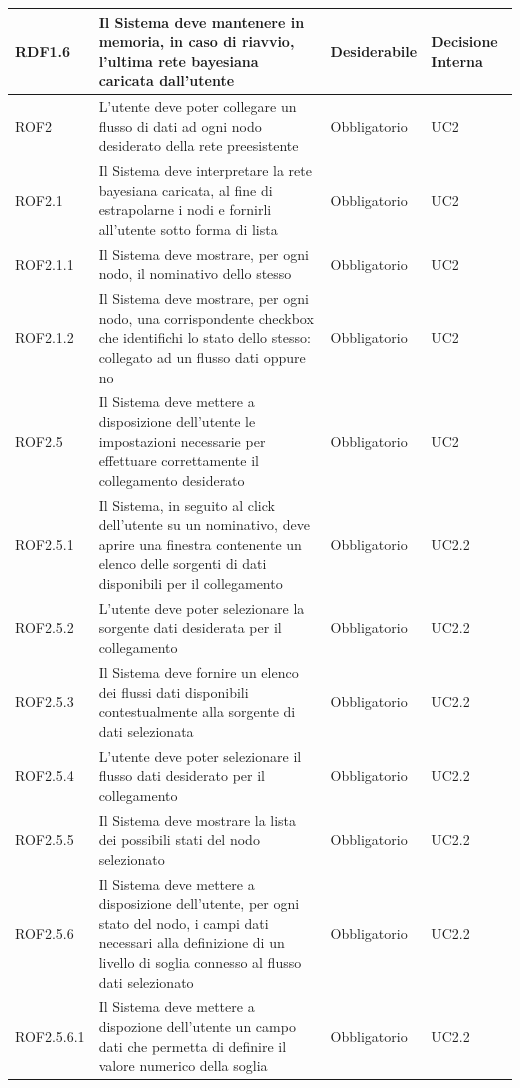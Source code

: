 \begin{center}
\begin{longtable}[c]{|m{}|m{}|m{}|m{}|}
\hline
RDF1.6 & Il Sistema deve mantenere in memoria, in caso di riavvio, l'ultima rete bayesiana caricata dall'utente & Desiderabile & Decisione Interna\\
\hline
\rowcolor{grigio}ROF2 & L'utente deve poter collegare un flusso di dati ad ogni nodo desiderato della rete preesistente & Obbligatorio & UC2\\
\hline
ROF2.1 & Il Sistema deve interpretare la rete bayesiana caricata, al fine di estrapolarne i nodi e fornirli all'utente sotto forma di lista & Obbligatorio & UC2\\
\hline
\rowcolor{grigio}ROF2.1.1 & Il Sistema deve mostrare, per ogni nodo, il nominativo dello stesso & Obbligatorio & UC2\\
\hline
ROF2.1.2 & Il Sistema deve mostrare, per ogni nodo, una corrispondente checkbox che identifichi lo stato dello stesso: collegato ad un flusso dati oppure no & Obbligatorio & UC2\\
\hline
\rowcolor{grigio}ROF2.5 & Il Sistema deve mettere a disposizione dell'utente le impostazioni necessarie per effettuare correttamente il collegamento desiderato & Obbligatorio & UC2\\
\hline
ROF2.5.1 & Il Sistema, in seguito al click dell'utente su un nominativo, deve aprire una finestra contenente un elenco delle sorgenti di dati disponibili per il collegamento & Obbligatorio & UC2.2\\
\hline
\rowcolor{grigio}ROF2.5.2 & L'utente deve poter selezionare la sorgente dati desiderata per il collegamento & Obbligatorio & UC2.2\\
\hline
ROF2.5.3 & Il Sistema deve fornire un elenco dei flussi dati disponibili contestualmente alla sorgente di dati selezionata & Obbligatorio & UC2.2\\
\hline
\rowcolor{grigio}ROF2.5.4 & L'utente deve poter selezionare il flusso dati desiderato per il collegamento & Obbligatorio & UC2.2\\
\hline
ROF2.5.5 & Il Sistema deve mostrare la lista dei possibili stati del nodo selezionato & Obbligatorio & UC2.2\\
\hline
\rowcolor{grigio}ROF2.5.6 & Il Sistema deve mettere a disposizione dell'utente, per ogni stato del nodo, i campi dati necessari alla definizione di un livello di soglia connesso al flusso dati selezionato & Obbligatorio & UC2.2\\
\hline
ROF2.5.6.1 & Il Sistema deve mettere a dispozione dell'utente un campo dati che permetta di definire il valore numerico della soglia & Obbligatorio & UC2.2\\

\end{longtable}
\end{center}

